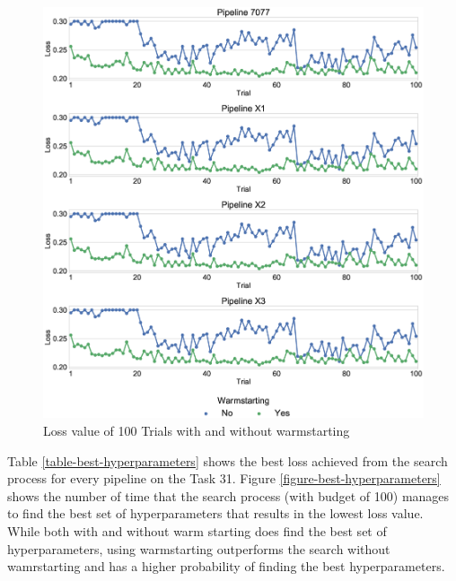 \begin{figure}
\centering
\includegraphics[width=\columnwidth]{../images/experiment-results/task31-cold-starting-warm-avgtrials.eps}
\caption{Loss value of 100 Trials with and without warmstarting}
\label{fig-avg-warm-vs-cold-task-31}
\end{figure}

Table \ref{table-best-hyperparameters} shows the best loss achieved from the search process for every pipeline on the Task 31.
Figure \ref{figure-best-hyperparameters} shows the number of time that the search process (with budget of 100) manages to find the best set of hyperparameters that results in the lowest loss value.
While both with and without warm starting does find the best set of hyperparameters, using warmstarting outperforms the search without wamrstarting and has a higher probability of finding the best hyperparameters.

